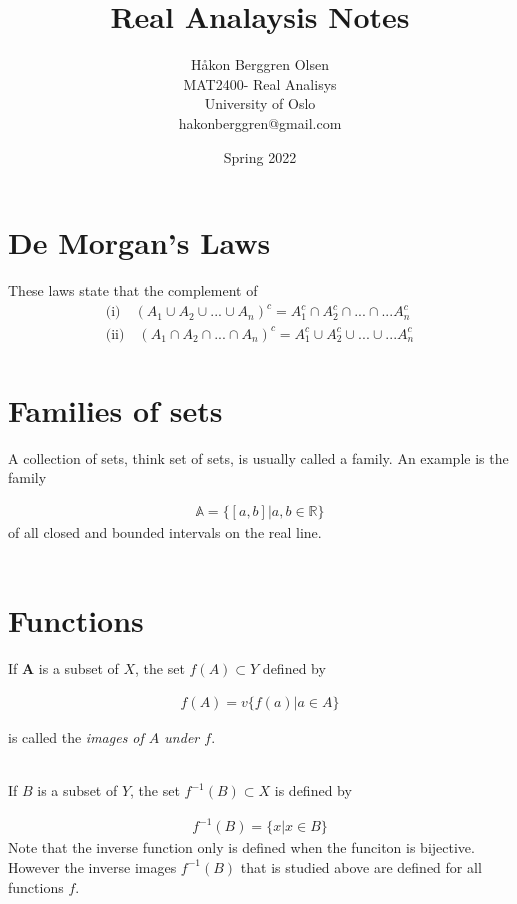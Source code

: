 \documentclass[12pt,letterpaper]{article}
\title{Real Analaysis Notes}
\author{Håkon Berggren Olsen\\
  \small{MAT2400- Real Analisys}\\
  \small{University of Oslo}\\
  \small{hakonberggren@gmail.com}
}
\date{Spring 2022}
\begin{document}
 
\maketitle



\section*{De Morgan's Laws}
These laws state that the complement of 
\begin{align*}
	\text{(i)} \quad  (A_1 \cup A_2 \cup... \cup A_n)^c = A_1^c \cap A_2^c \cap ... \cap...A_n^c \\
	\text{(ii)} \quad  (A_1 \cap A_2 \cap... \cap A_n)^c = A_1^c \cup A_2^c \cup ... \cup...A_n^c \\
\end{align*}

\section*{Families of sets}
A collection of sets, think set of sets, is usually called a family. An example is the family

\begin{align*}
	\mathbb{A} = \{[a,b] | a,b \in \mathbb{R}\}
\end{align*}
of all closed and bounded intervals on the real line. \\


\noindent \\
\section*{Functions}
If $\mathbf{A}$ is a subset of $X$, the set $f(A) \subset Y$ defined by


\begin{align*}
	f(A) = v\{ f(a) | a \in A\}
\end{align*}

is called the \textit{images of $A$ under $f$}. 

\noindent \\
If $B$ is a subset of $Y$, the set $f^{-1}(B) \subset X$ is defined by

\begin{align*}
	f^{-1}(B) = \{ x | x \in B\}
\end{align*}
Note that the inverse function only is defined when the funciton is bijective. However the inverse images $f^{-1}(B)$ that is studied above are defined for all functions $f$.
\end{document}
